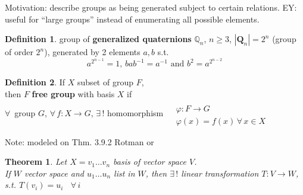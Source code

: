 \documentclass[twoside,landscape]{amsart}
\theoremstyle{plain}
\newtheorem{theorem}{Theorem}
\theoremstyle{definition}
\newtheorem{definition}{Definition}
\theoremstyle{remark}
\begin{document}
\begin{multicols*}{2}
Motivation: describe groups as being generated subject to certain relations.  EY: useful for ``large groups'' instead of enumerating all possible elements.  

\begin{definition}
  group of \textbf{generalized quaternions} $\mathbb{Q}_n$, $n\geq 3$, $|\mathbf{Q}_n|=2^n$ (group of order $2^n$), generated by 2 elements $a,b$ s.t. 
\[
a^{2^{n-1}} = 1, \, bab^{-1} = a^{-1} \text{ and } b^2 = a^{2^{n-2}}
\]
\end{definition}

\begin{definition}
If $X$ subset of group $F$, \\
then $F$ \textbf{free group} with basis $X$ if  \\
$\forall \, $ group $G$, $\forall \, f: X \to G$, $\exists \, !$ homomorphism $\begin{aligned} & \quad \\
  & \varphi : F \to G \\
  & \varphi(x) = f(x) \, \forall \, x \in X \end{aligned}$


\end{definition}

Note: modeled on Thm. 3.9.2 Rotman or 


\begin{theorem}
  Let $X=v_1 \dots v_n$ basis of vector space $V$.   \\
If $W$ vector space and $u_1 \dots u_n$ list in $W$, then $\exists \, !$ linear transformation $T:V\to W$, s.t. $T(v_i)=u_i $ \quad \, $\forall \, i$



\end{theorem}
\end{multicols*}
\end{document}
